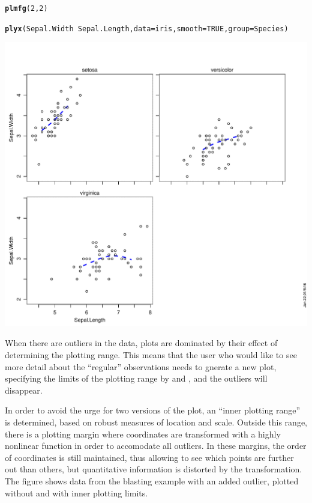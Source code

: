 \documentclass[11pt]{article}\usepackage[]{graphicx}\usepackage[]{color}
\makeatletter
\def\maxwidth{ %
  \ifdim\Gin@nat@width>\linewidth
    \linewidth
  \else
    \Gin@nat@width
  \fi
}
\newcommand{\hlnum}[1]{\textcolor[rgb]{0.686,0.059,0.569}{#1}}%
\newcommand{\hlopt}[1]{\textcolor[rgb]{0,0,0}{#1}}%
\newcommand{\hlstd}[1]{\textcolor[rgb]{0.345,0.345,0.345}{#1}}%
\newcommand{\hlkwc}[1]{\textcolor[rgb]{0.333,0.667,0.333}{#1}}%
\newcommand{\hlkwd}[1]{\textcolor[rgb]{0.737,0.353,0.396}{\textbf{#1}}}%
\newenvironment{kframe}{%
 \def\at@end@of@kframe{}%
 \ifinner\ifhmode%
  \def\at@end@of@kframe{\end{minipage}}%
  \begin{minipage}{\columnwidth}%
 \fi\fi%
 \def\FrameCommand##1{\hskip\@totalleftmargin \hskip-\fboxsep
 \colorbox{shadecolor}{##1}\hskip-\fboxsep
     \hskip-\linewidth \hskip-\@totalleftmargin \hskip\columnwidth}%
 \MakeFramed {\advance\hsize-\width
   \@totalleftmargin\z@ \linewidth\hsize
   \@setminipage}}%
 {\par\unskip\endMakeFramed%
 \at@end@of@kframe}
\newenvironment{knitrout}{}{} %
\makeatother
\begin{document}
\begin{knitrout}
\color{fgcolor}\begin{kframe}
\begin{alltt}
\hlkwd{plmfg}\hlstd{(}\hlnum{2}\hlstd{,}\hlnum{2}\hlstd{)}

\hlkwd{plyx}\hlstd{(Sepal.Width}\hlopt{~}\hlstd{Sepal.Length,} \hlkwc{data}\hlstd{=iris,} \hlkwc{smooth}\hlstd{=}\hlnum{TRUE}\hlstd{,} \hlkwc{group}\hlstd{=Species)}
\end{alltt}
\end{kframe}
\includegraphics[width=\maxwidth]{figure/plyx_group-1} 

\end{knitrout}

When there are outliers in the data, plots are dominated by their effect of
determining the plotting range. This means that the user who would like to
see more detail about the ``regular'' observations needs to gnerate a new
plot, specifying the limits of the plotting range by  and ,
and the outliers will disappear.

In order to avoid the urge for two versions of the plot, an ``inner
plotting range'' is determined, based on robust measures of 
location and scale. Outside this range, there is a plotting margin where
coordinates are transformed with a highly nonlinear function in order to
accomodate all outliers. 
In these margins, the order of coordinates is still maintained, thus
allowing to see which points are further out than others, but quantitative
information is distorted by the transformation.
The figure shows data from the blasting example with an added outlier,
plotted without and with inner plotting limits.
\end{document}
